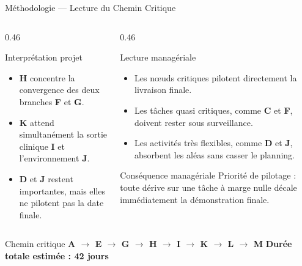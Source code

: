 \begin{frame}{Méthodologie --- Lecture du Chemin Critique}
    \tiny
    \setlength{\columnsep}{0.8cm}
    \begin{columns}[T,onlytextwidth]
        \begin{column}{0.46\textwidth}
            \begin{block}{Interprétation projet}
                \begin{itemize}
                    \item \textbf{H} concentre la convergence des deux branches \textbf{F} et \textbf{G}.
                    \item \textbf{K} attend simultanément la sortie clinique \textbf{I} et l'environnement \textbf{J}.
                    \item \textbf{D} et \textbf{J} restent importantes, mais elles ne pilotent pas la date finale.
                \end{itemize}
            \end{block}
        \end{column}
        \begin{column}{0.46\textwidth}
            \begin{block}{Lecture managériale}
                \begin{itemize}
                    \item Les n{\oe}uds critiques pilotent directement la livraison finale.
                    \item Les tâches quasi critiques, comme \textbf{C} et \textbf{F}, doivent rester sous surveillance.
                    \item Les activités très flexibles, comme \textbf{D} et \textbf{J}, absorbent les aléas sans casser le planning.
                \end{itemize}
            \end{block}
            \vspace{0.16cm}
            \begin{alertblock}{Conséquence managériale}
                Priorité de pilotage : toute dérive sur une tâche à marge nulle décale immédiatement la démonstration finale.
            \end{alertblock}
        \end{column}
    \end{columns}

    \vspace{0.18cm}
    \begin{alertblock}{Chemin critique}
        \textbf{A $\rightarrow$ E $\rightarrow$ G $\rightarrow$ H $\rightarrow$ I $\rightarrow$ K $\rightarrow$ L $\rightarrow$ M}
        \hfill \textbf{Durée totale estimée : 42 jours}
    \end{alertblock}
\end{frame}

